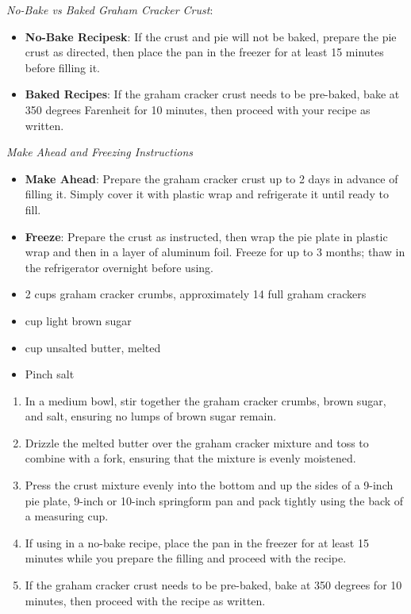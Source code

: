 
\textit{No-Bake vs Baked Graham Cracker Crust}:
\begin{itemize}
    \item \textbf{No-Bake Recipesk}: If the crust and pie will not be baked,
    prepare the pie crust as directed, then place the pan in the freezer for at
    least 15 minutes before filling it.
    \item \textbf{Baked Recipes}: If the graham cracker crust needs to be
    pre-baked, bake at 350 degrees Farenheit for 10 minutes, then proceed with your
    recipe as written.
\end{itemize}


\textit{Make Ahead and Freezing Instructions}
\begin{itemize}
    \item \textbf{Make Ahead}: Prepare the graham cracker crust up to 2 days in
    advance of filling it. Simply cover it with plastic wrap and refrigerate it
    until ready to fill.
    \item \textbf{Freeze}: Prepare the crust as instructed, then wrap the pie
    plate in plastic wrap and then in a layer of aluminum foil. Freeze for up to
    3 months; thaw in the refrigerator overnight before using.
\end{itemize}

\ingredients
\begin{itemize}
    \item 2 cups graham cracker crumbs, approximately 14 full graham crackers
    \item {} cup light brown sugar
    \item {} cup unsalted butter, melted
    \item Pinch salt
\end{itemize}

\instructions
\begin{enumerate}
    \item In a medium bowl, stir together the graham cracker crumbs, brown
    sugar, and salt, ensuring no lumps of brown sugar remain.

    \item Drizzle the melted butter over the graham cracker mixture and toss to
    combine with a fork, ensuring that the mixture is evenly moistened.

    \item Press the crust mixture evenly into the bottom and up the sides of a
    9-inch pie plate, 9-inch or 10-inch springform pan and pack tightly using
    the back of a measuring cup.
    \item If using in a no-bake recipe, place the pan in the freezer for at
    least 15 minutes while you prepare the filling and proceed with the recipe.
    \item If the graham cracker crust needs to be pre-baked, bake at 350 degrees
    for 10 minutes, then proceed with the recipe as written.
\end{enumerate}

